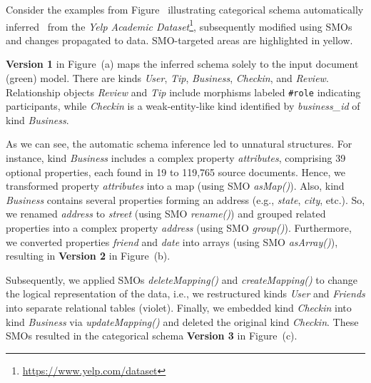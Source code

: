 \begin{example}
Consider the examples from Figure~ illustrating categorical schema automatically inferred~\citep{koupil2022mminfer} from the \textit{Yelp Academic Dataset}\footnote{\url{https://www.yelp.com/dataset}}, subsequently modified using SMOs and changes propagated to data. %
SMO-targeted areas are highlighted in yellow.

\textbf{Version 1} in Figure~(a) maps the inferred schema solely to the input document (green) model. There are kinds \emph{User}, \emph{Tip}, \emph{Business}, \emph{Checkin}, and \emph{Review}. %
Relationship objects \emph{Review} and \emph{Tip} include morphisms labeled \texttt{\#role} indicating participants, while \emph{Checkin} is a weak-entity-like kind identified by \emph{business\_id} of kind \emph{Business}.

As we can see, the automatic schema inference led to unnatural structures. For instance, kind \emph{Business} includes a complex property \emph{attributes}, comprising 39 optional properties, each found in 19 to 119,765 source documents. Hence, we transformed property \emph{attributes} into a map (using SMO \emph{asMap()}). Also, kind \emph{Business} contains several properties forming an address (e.g., \emph{state}, \emph{city}, etc.). So, we renamed \emph{address} to \emph{street} (using SMO \emph{rename()}) and grouped related properties into a complex property \emph{address} (using SMO \emph{group()}). Furthermore, we converted properties \emph{friend} and \emph{date} into arrays (using SMO \emph{asArray()}), resulting in \textbf{Version 2} in Figure~(b).

Subsequently, we applied SMOs \emph{deleteMapping()} and \emph{createMapping()} to change the logical representation of the data, i.e., we restructured kinds \emph{User} and \emph{Friends} into separate relational tables (violet). Finally, we embedded kind \emph{Checkin} into kind \emph{Business} via \emph{updateMapping()} and deleted the original kind \emph{Checkin}. These SMOs resulted in the categorical schema \textbf{Version 3} in Figure~(c).%
\end{example}

